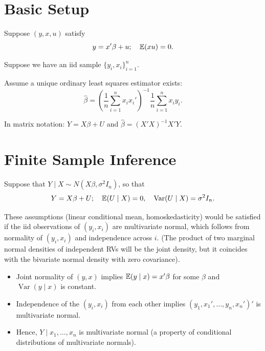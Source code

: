 
\section{Basic Setup}

\begin{definition}	Suppose $(y,x,u)$ satisfy \[
		y = x' \beta + u; \quad \mathbb{E}(xu) = 0
	.\] 
	
	Suppose we have an iid sample $\{y_i, x_i\}_{i=1}^{n}$.
	
	Assume a unique ordinary least squares estimator exists: \[
		\hat{\beta} = \left( \frac{1}{n} \sum_{i=1}^{n} x_i x_i' \right)^{-1} \frac{1}{n} \sum_{i=1}^{n} x_i y_i
	.\] 
	
	In matrix notation: $Y = X\beta + U$ and $\hat{\beta} = (X'X)^{-1} X' Y$.
\end{definition}

\section{Finite Sample Inference}

\begin{assumption}	Suppose that $Y \mid X \sim N(X\beta, \sigma^2 I_n)$, so that \[
		Y = X\beta + U; \quad \mathbb{E}(U \mid X) = 0, \quad \operatorname{Var}(U \mid X) = \sigma^2 I_n
	.\] 
\end{assumption}

\begin{remark}	These assumptions (linear conditional mean, homoskedasticity) would be satisfied if the iid observations of $(y_i, x_i)$ are multivariate normal, which follows from normality of $(y_i,x_i)$ and independence across $i$. (The product of two marginal normal densities of independent RVs will be the joint density, but it coincides with the bivariate normal density with zero covariance).
	\begin{itemize}
		\item Joint normality of $(y,x)$ implies $\mathbb{E}(y \mid x) = x' \beta$ for some $\beta$ and $\operatorname{Var}(y \mid x)$ is constant.
		\item Independence of the $(y_i, x_i)$ from each other implies $(y_1, x_1', \ldots, y_n, x_n')'$ is multivariate normal.
		\item Hence, $Y \mid x_1, \ldots, x_n$ is multivariate normal (a property of conditional distributions of multivariate normals).
	\end{itemize}
\end{remark}

